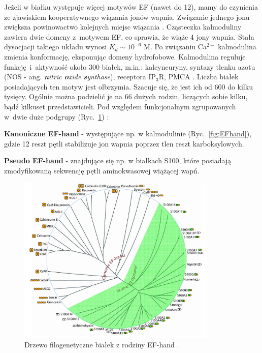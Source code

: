 Jeżeli w białku występuje więcej motywów EF (nawet do 12), mamy do czynienia ze zjawiskiem kooperatywnego wiązania jonów wapnia. Związanie jednego jonu zwiększa powinowactwo kolejnych miejsc wiązania \cite{Lewit-Bentley2000}. Cząsteczka kalmoduliny zawiera dwie domeny z~motywem EF, co sprawia, że wiąże 4 jony wapnia. Stała dysocjacji takiego układu wynosi $K_d \sim 10^{-6}$ M. Po związaniu Ca$^{2+}$ kalmodulina zmienia konformację, eksponując domeny hydrofobowe. Kalmodulina reguluje funkcję~i~aktywność około 300 białek, m.in.: kalcyneuryny, syntazy tlenku azotu (NOS - ang. \textit{\textbf{n}itric \textbf{o}xide \textbf{s}ynthase}), receptora IP$_3$R, PMCA \cite{Stull2001}.
Liczba białek posiadających ten motyw jest olbrzymia. Szacuje się, że jest ich od 600 do kilku tysięcy. Ogólnie można podzielić je na 66 dużych rodzin, liczących sobie kilku, bądź kilkuset przedstawicieli. Pod względem funkcjonalnym zgrupowanych w~dwie duże podgrupy (Ryc.~\ref{fig:EFhandtree}) \cite{Zhou2006}:

\begin{bulletList}
\item \textbf{Kanoniczne EF-hand} - występujące np. w kalmodulinie (Ryc.~\ref{fig:EFhand}), gdzie 12 reszt pętli stabilizuje jon wapnia poprzez tlen reszt karboksylowych.
\item \textbf{Pseudo EF-hand} - znajdujące się np. w białkach S100, które posiadają zmodyfikowaną sekwencję pętli aminokwasowej wiążącej wapń.
\end{bulletList}

\begin{figure}
	\centering
	\includegraphics[width=0.85\textwidth]{rysunki/rozdzial_1/EFhandtree.jpg}
	\caption[Drzewo filogenetyczne białek z rodziny EF-hand]{Drzewo filogenetyczne białek z rodziny EF-hand \cite{Zhou2006}.}
	\label{fig:EFhandtree}
\end{figure}


